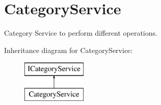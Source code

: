 \hypertarget{classWildLifeTracker_1_1CategoryService}{}\section{Category\+Service}
\label{classWildLifeTracker_1_1CategoryService}


Category Service to perform different operations.  


Inheritance diagram for Category\+Service\+:\begin{figure}[H]
\begin{center}
\leavevmode
\includegraphics[height=2.000000cm]{classWildLifeTracker_1_1CategoryService}
\end{center}
\end{figure}
